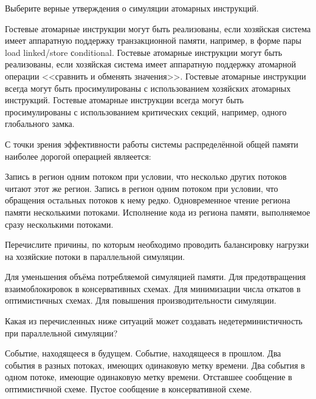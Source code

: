 \begin{questions}
\question[3] Выберите верные утверждения о симуляции атомарных инструкций.
\begin{choices}
    \correctchoice Гостевые атомарные инструкции могут быть реализованы, если хозяйская система имеет аппаратную поддержку транзакционной памяти, например, в форме пары load linked/store сonditional.
    \correctchoice Гостевые атомарные инструкции могут быть реализованы, если хозяйская система имеет аппаратную поддержку  атомарной операции <<сравнить и обменять значения>>.
    \choice Гостевые атомарные инструкции всегда могут быть просимулированы с использованием хозяйских атомарных инструкций.
    \choice Гостевые атомарные инструкции всегда могут быть просимулированы с использованием критических секций, например, одного глобального замка.
\end{choices}

\question[3] С точки зрения эффективности работы системы распределённой общей памяти наиболее дорогой операцией являеется:
\begin{choices}
    \correctchoice Запись в регион одним потоком при условии, что несколько других потоков читают этот же регион.
    \choice Запись в регион одним потоком при условии, что обращения остальных потоков к нему редко.
    \choice Одновременное чтение региона памяти несколькими потоками.
    \choice Исполнение кода из региона памяти, выполняемое сразу несколькими потоками.
\end{choices}

\question[3] Перечислите причины, по которым необходимо проводить балансировку нагрузки на хозяйские потоки в параллельной симуляции.
\begin{choices}
    \choice Для уменьшения объёма потребляемой симуляцией памяти.
    \choice Для предотвращения взаимоблокировок в консервативных схемах.
    \choice Для минимизации числа откатов в оптимистичных схемах.
    \correctchoice Для повышения производительности симуляции.
\end{choices}

\question[3] Какая из перечисленных ниже ситуаций может создавать недетерминистичность при параллельной симуляции?
\begin{choices}
    \choice Событие, находящееся в будущем.
    \choice Событие, находящееся в прошлом.
    \choice Два события в разных потоках, имеющих одинаковую метку времени.
    \correctchoice Два события в одном  потоке, имеющие одинаковую метку времени.
    \choice Отставшее сообщение в оптимистичной схеме.
    \choice Пустое сообщение в консервативной схеме.
\end{choices}


\end{questions}

